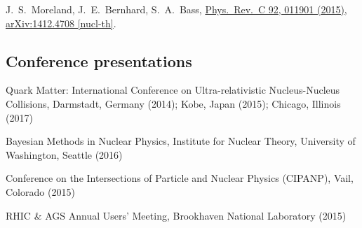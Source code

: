 \documentclass[letterpaper,10pt]{article}
\begin{document}
\begin{multicols}{2}
J.~S.~Moreland, J.~E.~Bernhard, S.~A.~Bass,
\href{https://journals.aps.org/prc/abstract/10.1103/PhysRevC.92.011901}{Phys.\ Rev.\ C 92, 011901 (2015)},
\href{https://arxiv.org/abs/1412.4708}{arXiv:1412.4708 [nucl-th]}.

\subsection{Conference presentations}

Quark Matter: International Conference on Ultra-relativistic Nucleus-Nucleus Collisions, Darmstadt, Germany (2014); Kobe, Japan (2015); Chicago, Illinois (2017)

Bayesian Methods in Nuclear Physics, Institute for Nuclear Theory, University of Washington, Seattle (2016)

Conference on the Intersections of Particle and Nuclear Physics (CIPANP), Vail, Colorado (2015)

RHIC \& AGS Annual Users' Meeting, Brookhaven National Laboratory (2015)


\end{multicols}
\end{document}
